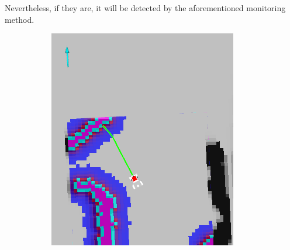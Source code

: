 \documentclass[english, master, utf8]{base/thesis_KBS}
\begin{document}
Nevertheless, if they are, it will be detected by the aforementioned monitoring method.
\begin{figure}[H]
    \centering
    \begin{subfigure}[b]{0.24\textwidth}
        \centering
        \includegraphics[width=\textwidth]{pics/succ_1.png}
        \caption{\textsc{}}
        \label{fig:succ_1}
    \end{subfigure}
    \hfill
    \begin{subfigure}[b]{0.24\textwidth}
        \centering

\end{subfigure}
\end{figure}
\end{document}
